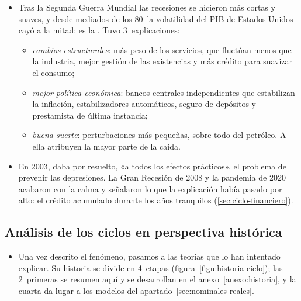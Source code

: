 \documentclass[11pt]{article}
\begin{document}
\begin{itemize}
\item Tras la Segunda Guerra Mundial las recesiones se hicieron más cortas y suaves, y desde mediados de los 80~la volatilidad del PIB de Estados Unidos cayó a la mitad: es la \nocite{KimNelson1999,McConnellPerezQuiros2000}. Tuvo 3~explicaciones\nocite{StockWatson2002Has,Bernanke2004Great}:
  \begin{itemize}
  \item \emph{cambios estructurales}: más peso de los servicios, que fluctúan menos que la industria, mejor gestión de las existencias y más crédito para suavizar el consumo;
  \item \emph{mejor política económica}: bancos centrales independientes que estabilizan la inflación, estabilizadores automáticos, seguro de depósitos y prestamista de última instancia;
  \item \emph{buena suerte}: perturbaciones más pequeñas, sobre todo del petróleo. A ella atribuyen \textcite{StockWatson2002Has} la mayor parte de la caída.
  \end{itemize}
\item En 2003, \textcite{Lucas2003} daba por resuelto, «a todos los efectos prácticos», el problema de prevenir las depresiones. La Gran Recesión de 2008 y la pandemia de 2020 acabaron con la calma y señalaron lo que la explicación había pasado por alto: el crédito acumulado durante los años tranquilos (\ref{sec:ciclo-financiero}).
\end{itemize}

\subsection{Análisis de los ciclos en perspectiva histórica}\label{sec:historia}

\begin{itemize}
\item Una vez descrito el fenómeno, pasamos a las teorías que lo han intentado explicar. Su historia se divide en 4~etapas (figura~\ref{figu:historia-ciclo}); las 2~primeras se resumen aquí y se desarrollan en el anexo~\ref{anexo:historia}, y la cuarta da lugar a los modelos del apartado~\ref{sec:nominales-reales}.
\end{itemize}

\begin{infografia}[H]
\centering
\caption{Las 4~etapas de la teoría del ciclo}\label{figu:historia-ciclo}
\end{infografia}
\end{document}
